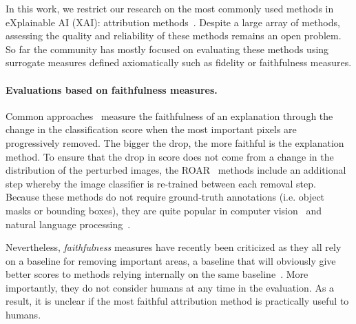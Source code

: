 In this work, we restrict our research on the most commonly used methods in eXplainable AI (XAI): attribution methods~\cite{simonyan2014deep, zeiler2014visualizing, ribeiro2016lime, selvaraju2017gradcam, sundararajan2017axiomatic, ancona2017better, smilkov2017smoothgrad,  petsiuk2018rise, fel2021sobol}. Despite a large array of methods, assessing the quality and reliability of these methods remains an open problem. So far the community has mostly focused on evaluating these methods using surrogate measures defined axiomatically such as fidelity or faithfulness measures.

\paragraph{Evaluations based on faithfulness measures.} Common approaches~\cite{samek2015evaluating, petsiuk2018rise} measure the faithfulness of an explanation through the change in the classification score when the most important pixels are progressively removed. The bigger the drop, the more faithful is the explanation method.
To ensure that the drop in score does not come from a change in the distribution of the perturbed images, the ROAR~\cite{hooker2018benchmark} methods include an additional step whereby the image classifier is re-trained between each removal step.
Because these methods do not require ground-truth annotations (i.e. object masks or bounding boxes), they are quite popular in computer vision~\cite{samek2015evaluating, petsiuk2018rise, fel2021sobol, fong2017perturbation, fong2019extremal, kapishnikov2019xrai} and natural language processing~\cite{arras2017explaining, arras2017relevant, fel2021sobol}.

Nevertheless, {\em faithfulness} measures have recently been criticized as they all rely on a baseline for removing important areas, a baseline that will obviously give better scores to methods relying internally on the same baseline~\cite{hsieh2020evaluations}. More importantly, they do not consider humans at any time in the evaluation. As a result, it is unclear if the most faithful attribution method is practically useful to humans.

